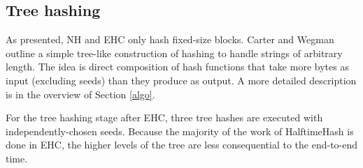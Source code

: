 \documentclass[runningheads]{llncs}
\begin{document}

\subsection{Tree hashing}

As presented, NH and EHC only hash fixed-size blocks.
Carter and Wegman outline a simple tree-like construction of hashing to handle strings of arbitrary length. \cite{badger,carter-wegman-79}
The idea is direct composition of hash functions that take more bytes as input (excluding seeds) than they produce as output.
A more detailed description is in the overview of Section \ref{algo}.

For the tree hashing stage after EHC, three tree hashes are executed with independently-chosen seeds.
Because the majority of the work of HalftimeHash is done in EHC, the higher levels of the tree are less consequential to the end-to-end time.








\end{document}
